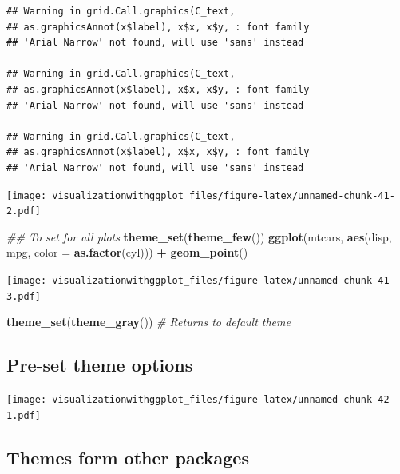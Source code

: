 \documentclass[]{krantz}
\makeatletter
\newenvironment{Shaded}{\begin{snugshade}}{\end{snugshade}}
\newcommand{\CommentTok}[1]{\textcolor[rgb]{0.56,0.35,0.01}{\textit{#1}}}
\newcommand{\DataTypeTok}[1]{\textcolor[rgb]{0.13,0.29,0.53}{#1}}
\newcommand{\KeywordTok}[1]{\textcolor[rgb]{0.13,0.29,0.53}{\textbf{#1}}}
\newcommand{\NormalTok}[1]{#1}
\newcommand{\OperatorTok}[1]{\textcolor[rgb]{0.81,0.36,0.00}{\textbf{#1}}}
\newcommand{\StringTok}[1]{\textcolor[rgb]{0.31,0.60,0.02}{#1}}
\newenvironment{kframe}{%
\medskip{}
\setlength{\fboxsep}{.8em}
 \def\at@end@of@kframe{}%
 \ifinner\ifhmode%
  \def\at@end@of@kframe{\end{minipage}}%
  \begin{minipage}{\columnwidth}%
 \fi\fi%
 \def\FrameCommand##1{\hskip\@totalleftmargin \hskip-\fboxsep
 \colorbox{shadecolor}{##1}\hskip-\fboxsep
     \hskip-\linewidth \hskip-\@totalleftmargin \hskip\columnwidth}%
 \MakeFramed {\advance\hsize-\width
   \@totalleftmargin\z@ \linewidth\hsize
   \@setminipage}}%
 {\par\unskip\endMakeFramed%
 \at@end@of@kframe}
\renewenvironment{Shaded}{\begin{kframe}}{\end{kframe}}
\makeatother
\begin{document}
\begin{verbatim}
## Warning in grid.Call.graphics(C_text,
## as.graphicsAnnot(x$label), x$x, x$y, : font family
## 'Arial Narrow' not found, will use 'sans' instead

## Warning in grid.Call.graphics(C_text,
## as.graphicsAnnot(x$label), x$x, x$y, : font family
## 'Arial Narrow' not found, will use 'sans' instead

## Warning in grid.Call.graphics(C_text,
## as.graphicsAnnot(x$label), x$x, x$y, : font family
## 'Arial Narrow' not found, will use 'sans' instead
\end{verbatim}

\texttt{[image: visualizationwithggplot\_files/figure-latex/unnamed-chunk-41-2.pdf]}

\begin{Shaded}
\begin{Highlighting}[]
\CommentTok{## To set for all plots}
\KeywordTok{theme_set}\NormalTok{(}\KeywordTok{theme_few}\NormalTok{())}
\KeywordTok{ggplot}\NormalTok{(mtcars, }\KeywordTok{aes}\NormalTok{(disp,  mpg, }\DataTypeTok{color =} \KeywordTok{as.factor}\NormalTok{(cyl))) }\OperatorTok{+}\StringTok{ }\KeywordTok{geom_point}\NormalTok{()}
\end{Highlighting}
\end{Shaded}

\texttt{[image: visualizationwithggplot\_files/figure-latex/unnamed-chunk-41-3.pdf]}

\begin{Shaded}
\begin{Highlighting}[]
\KeywordTok{theme_set}\NormalTok{(}\KeywordTok{theme_gray}\NormalTok{()) }\CommentTok{# Returns to default theme}
\end{Highlighting}
\end{Shaded}

\hypertarget{pre-set-theme-options}{%
\subsection{Pre-set theme options}\label{pre-set-theme-options}}

\texttt{[image: visualizationwithggplot\_files/figure-latex/unnamed-chunk-42-1.pdf]}

\hypertarget{themes-form-other-packages}{%
\subsection{Themes form other packages}\label{themes-form-other-packages}}
\end{document}
